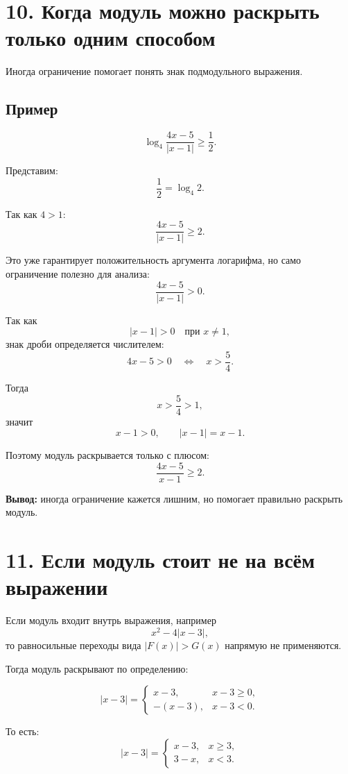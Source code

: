 \documentclass[a4paper,12pt]{article}
\newcommand{\sectionline}{\vspace{0.35em}{\color{accent}\hrule height 0.6pt}\vspace{0.65em}}
\newcommand{\important}[1]{\textcolor{darkaccent}{\textbf{#1}}}
\begin{document}
\section*{\textcolor{darkaccent}{10. Когда модуль можно раскрыть только одним способом}}
\sectionline

Иногда ограничение помогает понять знак подмодульного выражения.

\subsection*{\textcolor{accent}{Пример}}

\[
\log_4\frac{4x-5}{|x-1|}\ge\frac12.
\]

Представим:
\[
\frac12=\log_4 2.
\]

Так как $4>1$:
\[
\frac{4x-5}{|x-1|}\ge2.
\]

Это уже гарантирует положительность аргумента логарифма, но само ограничение полезно для анализа:
\[
\frac{4x-5}{|x-1|}>0.
\]

Так как
\[
|x-1|>0 \quad \text{при } x\ne1,
\]
знак дроби определяется числителем:
\[
4x-5>0
\quad\Longleftrightarrow\quad
x>\frac54.
\]

Тогда
\[
x>\frac54>1,
\]
значит
\[
x-1>0,
\qquad
|x-1|=x-1.
\]

Поэтому модуль раскрывается только с плюсом:
\[
\frac{4x-5}{x-1}\ge2.
\]

\important{Вывод:} иногда ограничение кажется лишним, но помогает правильно раскрыть модуль.

\section*{\textcolor{darkaccent}{11. Если модуль стоит не на всём выражении}}
\sectionline

Если модуль входит внутрь выражения, например
\[
x^2-4|x-3|,
\]
то равносильные переходы вида $|F(x)|>G(x)$ напрямую не применяются.

Тогда модуль раскрывают по определению:

\[
|x-3|=
\begin{cases}
x-3, & x-3\ge0,\\
-(x-3), & x-3<0.
\end{cases}
\]

То есть:
\[
|x-3|=
\begin{cases}
x-3, & x\ge3,\\
3-x, & x<3.
\end{cases}
\]
\end{document}
